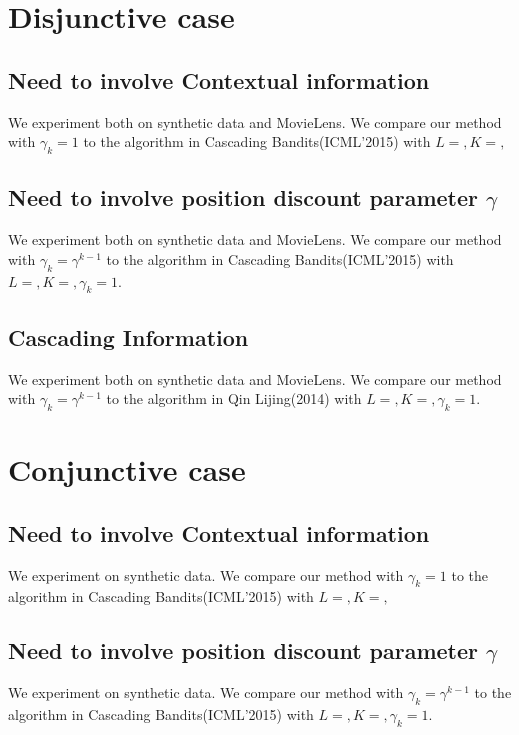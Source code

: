 \documentclass[a4paper,11pt]{article}
\begin{document}
\section{Disjunctive case}

\subsection{Need to involve Contextual information}

We experiment both on synthetic data and MovieLens. We compare our method with $\gamma_k = 1$ to the algorithm in Cascading Bandits(ICML'2015) with $L= , K= ,$

\subsection{Need to involve position discount parameter $\gamma$}

We experiment both on synthetic data and MovieLens. We compare our method with $\gamma_k = \gamma^{k-1}$ to the algorithm in Cascading Bandits(ICML'2015) with $L= , K= , \gamma_k=1$.

\subsection{Cascading Information}

We experiment both on synthetic data and MovieLens. We compare our method with $\gamma_k = \gamma^{k-1}$ to the algorithm in Qin Lijing(2014) with $L= , K= , \gamma_k=1$.


\section{Conjunctive case}

\subsection{Need to involve Contextual information}

We experiment on synthetic data. We compare our method with $\gamma_k = 1$ to the algorithm in Cascading Bandits(ICML'2015) with $L= , K= ,$

\subsection{Need to involve position discount parameter $\gamma$}

We experiment on synthetic data. We compare our method with $\gamma_k = \gamma^{k-1}$ to the algorithm in Cascading Bandits(ICML'2015) with $L= , K= , \gamma_k=1$.
\end{document}
